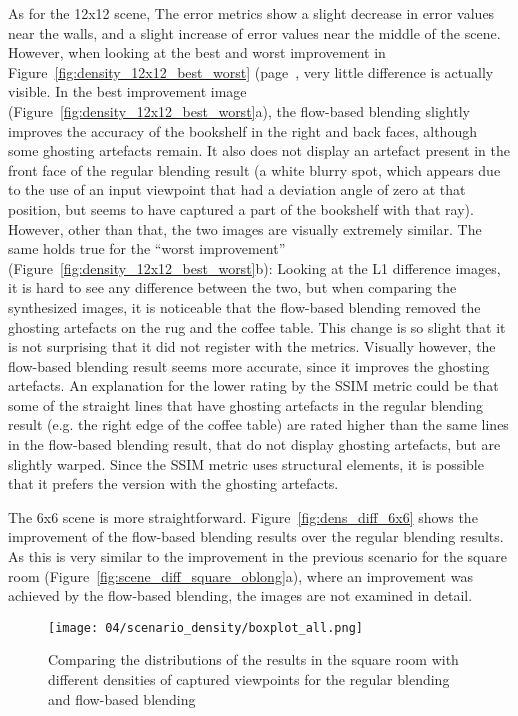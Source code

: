 As for the 12x12 scene, The error metrics show a slight decrease in error values near the walls, and a slight increase of error values near the middle of the scene. However, when looking at the best and worst improvement in Figure~\ref{fig:density_12x12_best_worst} (page~\pageref{fig:density_12x12_best_worst}, very little difference is actually visible. In the best improvement image (Figure~\ref{fig:density_12x12_best_worst}a), the flow-based blending slightly improves the accuracy of the bookshelf in the right and back faces, although some ghosting artefacts remain. It also does not display an artefact present in the front face of the regular blending result (a white blurry spot, which appears due to the use of an input viewpoint that had a deviation angle of zero at that position, but seems to have captured a part of the bookshelf with that ray). However, other than that, the two images are visually extremely similar. The same holds true for the ``worst improvement'' (Figure~\ref{fig:density_12x12_best_worst}b): Looking at the L1 difference images, it is hard to see any difference between the two, but when comparing the synthesized images, it is noticeable that the flow-based blending removed the ghosting artefacts on the rug and the coffee table. This change is so slight that it is not surprising that it did not register with the metrics. Visually however, the flow-based blending result seems more accurate, since it improves the ghosting artefacts. An explanation for the lower rating by the SSIM metric could be that some of the straight lines that have ghosting artefacts in the regular blending result (e.g. the right edge of the coffee table) are rated higher than the same lines in the flow-based blending result, that do not display ghosting artefacts, but are slightly warped. Since the SSIM metric uses structural elements, it is possible that it prefers the version with the ghosting artefacts.

The 6x6 scene is more straightforward. Figure~\ref{fig:dens_diff_6x6} shows the improvement of the flow-based blending results over the regular blending results. As this is very similar to the improvement in the previous scenario for the square room (Figure~\ref{fig:scene_diff_square_oblong}a), where an improvement was achieved by the flow-based blending, the images are not examined in detail.

\begin{figure}
		\centering
		\texttt{[image: 04/scenario\_density/boxplot\_all.png]}
		\caption[Comparing the distributions of all of the results with different densities]{Comparing the distributions of the results in the square room with different densities of captured viewpoints for the regular blending and flow-based blending}
		\label{fig:scenario_dens_boxplot}
\end{figure}


